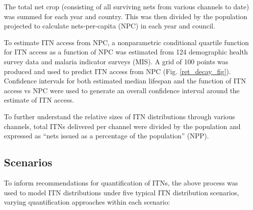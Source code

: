 \documentclass[review,
3p]{elsarticle} %
\begin{document}
The total net crop (consisting of all surviving nets from various
channels to date) was summed for each year and country. This was then
divided by the population projected to calculate nets-per-capita (NPC)
in each year and council.

To estimate ITN access from NPC, a nonparametric conditional quartile
function for ITN access as a function of NPC was estimated from 124
demographic health survey data and malaria indicator surveys (MIS). A
grid of 100 points was produced and used to predict ITN access from NPC
(Fig. \ref{ret_decay_fig}). Confidence intervals for both estimated
median lifespan and the function of ITN access vs NPC were used to
generate an overall confidence interval around the estimate of ITN
access.

To further understand the relative sizes of ITN distributions through
various channels, total ITNs delivered per channel were divided by the
population and expressed as ``nets issued as a percentage of the
population'' (NPP).

\hypertarget{scenarios}{%
\subsection{Scenarios}\label{scenarios}}

To inform recommendations for quantification of ITNs, the above process
was used to model ITN distributions under five typical ITN distribution
scenarios, varying quantification approaches within each scenario:
\end{document}

